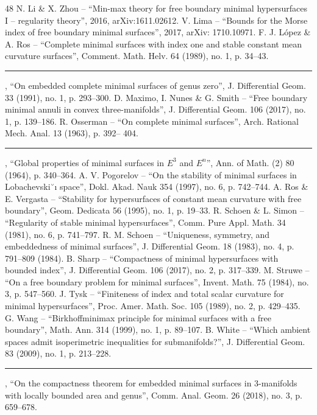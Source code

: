 \documentclass[10pt]{article}
\theoremstyle{definition}\newtheorem{definition}[thm]{Definition}
\numberwithin{equation}{section}
\begin{document}
\begin{thebibliography}{48}
 N. Li \& X. Zhou – “Min-max theory for free boundary minimal hypersurfaces I – regularity theory”, 2016, arXiv:1611.02612.
 V. Lima – “Bounds for the Morse index of free boundary minimal surfaces”, 2017, arXiv: 1710.10971.
 F. J. López \& A. Ros – “Complete minimal surfaces with index one and stable constant mean curvature surfaces”, Comment. Math. Helv. 64 (1989), no. 1, p. 34–43.
 \rule{2em}{.3pt} , “On embedded complete minimal surfaces of genus zero”, J. Diﬀerential Geom. 33 (1991), no. 1, p. 293–300.
 D. Maximo, I. Nunes \& G. Smith – “Free boundary minimal annuli in convex three-manifolds”, J. Diﬀerential Geom. 106 (2017), no. 1, p. 139–186.
 R. Osserman – “On complete minimal surfaces”, Arch. Rational Mech. Anal. 13 (1963), p. 392– 404.
 \rule{2em}{.3pt} , “Global properties of minimal surfaces in $E^3$ and $E^n$”, Ann. of Math. (2) 80 (1964), p. 340–364.
 A. V. Pogorelov – “On the stability of minimal surfaces in Lobachevski˘ı space”, Dokl. Akad. Nauk 354 (1997), no. 6, p. 742–744.
 A. Ros \& E. Vergasta – “Stability for hypersurfaces of constant mean curvature with free boundary”, Geom. Dedicata 56 (1995), no. 1, p. 19–33.
 R. Schoen \& L. Simon – “Regularity of stable minimal hypersurfaces”, Comm. Pure Appl. Math. 34 (1981), no. 6, p. 741–797.
 R. M. Schoen – “Uniqueness, symmetry, and embeddedness of minimal surfaces”, J. Diﬀerential Geom. 18 (1983), no. 4, p. 791–809 (1984).
 B. Sharp – “Compactness of minimal hypersurfaces with bounded index”, J. Diﬀerential Geom. 106 (2017), no. 2, p. 317–339.
 M. Struwe – “On a free boundary problem for minimal surfaces”, Invent. Math. 75 (1984), no. 3, p. 547–560.
 J. Tysk – “Finiteness of index and total scalar curvature for minimal hypersurfaces”, Proc. Amer. Math. Soc. 105 (1989), no. 2, p. 429–435.
 G. Wang – “Birkhoﬀminimax principle for minimal surfaces with a free boundary”, Math. Ann. 314 (1999), no. 1, p. 89–107.
 B. White – “Which ambient spaces admit isoperimetric inequalities for submanifolds?”, J. Differential Geom. 83 (2009), no. 1, p. 213–228.
 \rule{2em}{.3pt} , “On the compactness theorem for embedded minimal surfaces in 3-manifolds with locally bounded area and genus”, Comm. Anal. Geom. 26 (2018), no. 3, p. 659–678.
\end{thebibliography}
\endgroup
\end{document}
